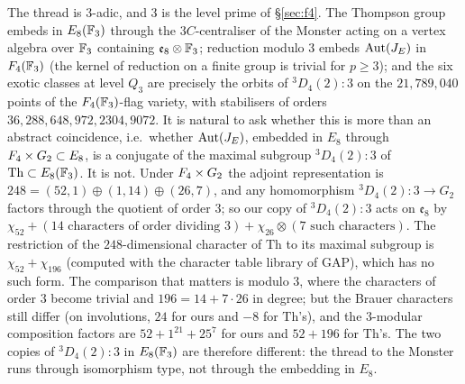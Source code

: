 \documentclass[11pt]{amsart}
\theoremstyle{definition}
\begin{document}
The thread is $3$-adic, and $3$ is the level prime of \S\ref{sec:f4}. The Thompson group embeds in $E_8(\mathbb{F}_3)$ through the $3C$-centraliser of the Monster acting on a vertex algebra over $\mathbb{F}_3$ containing $\mathfrak e_8\otimes\mathbb{F}_3$; reduction modulo $3$ embeds $\operatorname{Aut}(J_E)$ in $F_4(\mathbb{F}_3)$ (the kernel of reduction on a finite group is trivial for $p\ge3$); and the six exotic classes at level $Q_3$ are precisely the orbits of ${}^3D_4(2){:}3$ on the $21{,}789{,}040$ points of the $F_4(\mathbb{F}_3)$-flag variety, with stabilisers of orders $36,288,648,972,2304,9072$.
It is natural to ask whether this is more than an abstract coincidence, i.e.\ whether $\operatorname{Aut}(J_E)$, embedded in $E_8$ through $F_4\times G_2\subset E_8$, is a conjugate of the maximal subgroup ${}^3D_4(2){:}3$ of $\mathrm{Th}\subset E_8(\mathbb{F}_3)$. It is not. Under $F_4\times G_2$ the adjoint representation is $248=(52,1)\oplus(1,14)\oplus(26,7)$, and any homomorphism ${}^3D_4(2){:}3\to G_2$ factors through the quotient of order $3$; so our copy of ${}^3D_4(2){:}3$ acts on $\mathfrak e_8$ by $\chi_{52}+(14\text{ characters of order dividing }3)+\chi_{26}\otimes(7\text{ such characters})$. The restriction of the $248$-dimensional character of $\mathrm{Th}$ to its maximal subgroup is $\chi_{52}+\chi_{196}$ (computed with the character table library of GAP), which has no such form. The comparison that matters is modulo $3$, where the characters of order $3$ become trivial and $196=14+7\cdot26$ in degree; but the Brauer characters still differ (on involutions, $24$ for ours and $-8$ for $\mathrm{Th}$'s), and the $3$-modular composition factors are $52+1^{21}+25^{7}$ for ours and $52+196$ for $\mathrm{Th}$'s. The two copies of ${}^3D_4(2){:}3$ in $E_8(\mathbb{F}_3)$ are therefore different: the thread to the Monster runs through isomorphism type, not through the embedding in $E_8$.
\end{document}
